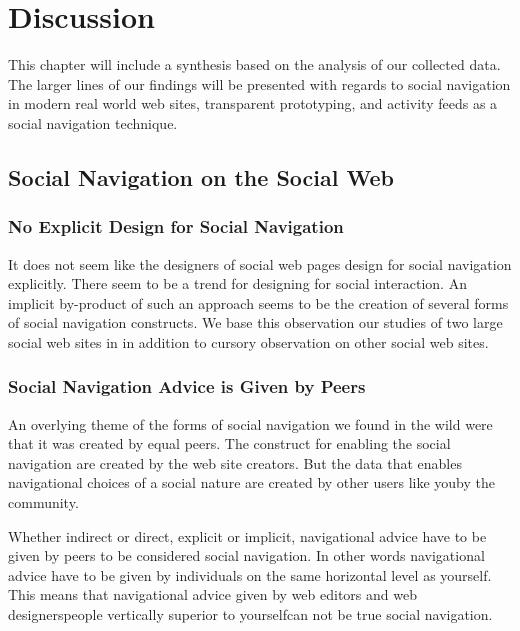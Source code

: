 \chapter{Discussion}
\label{chapter:discussion}

This chapter will include a synthesis based on the analysis of our collected
data. The larger lines of our findings will be presented with regards to
social navigation in modern real world web sites, transparent prototyping, and
activity feeds as a social navigation technique.

\section{Social Navigation on the Social Web}

\subsection{No Explicit Design for Social Navigation}

It does not seem like the designers of social web pages design for social
navigation explicitly. There seem to be a trend for designing for social
interaction. An implicit by-product of such an approach seems to be
the creation of several forms of social navigation constructs.
We base this observation our studies of two large social web sites in
 in addition to cursory observation on other social web
sites.

\subsection{Social Navigation Advice is Given by Peers}

An overlying theme of the forms of social navigation we found in the wild were
that it was created by equal peers. The construct for enabling the social
navigation are created by the web site creators. But the data that
enables navigational choices of a social nature are created by other users
like you\dash{}by the community.

Whether indirect or direct, explicit or implicit, navigational advice have to
be given by peers to be considered social navigation. In other words
navigational advice have to be given by individuals on the same horizontal
level as yourself. This means that navigational advice given by web editors
and web designers\dash{}people vertically superior to yourself\dash{}can not
be true social navigation.

